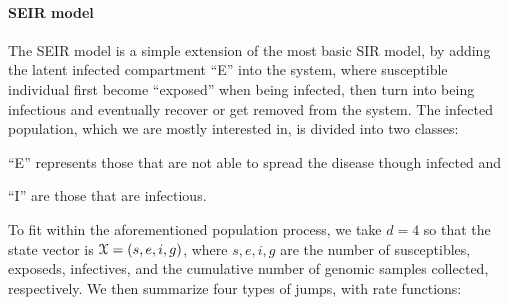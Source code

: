\documentclass[11pt,reqno,final]{amsart}\usepackage[]{graphicx}\usepackage[]{color}
\begin{document}
\begin{figure}
\begin{minipage}{.5\textwidth}
\end{minipage}%
\begin{minipage}{.5\textwidth}
\end{minipage}
\caption{
  \label{fig:diagram}
}
\end{figure}

\paragraph{SEIR model}
The SEIR model is a simple extension of the most basic SIR model, by adding the latent infected compartment ``E'' into the system, where susceptible individual first become ``exposed'' when being infected, then turn into being infectious and eventually recover or get removed from the system. The infected population, which we are mostly interested in, is divided into two classes:
\begin{inparaenum}
  \item ``E'' represents those that are not able to spread the disease though infected and 
  \item ``I'' are those that are infectious. 
\end{inparaenum}
To fit within the aforementioned population process, we take $d=4$ so that the state vector is $\mathcal{X}=\left(s,e,i,g\right)$, where $s,e,i,g$ are the number of susceptibles, exposeds, infectives, and the cumulative number of genomic samples collected, respectively. We then summarize four types of jumps, with rate functions:
\end{document}
